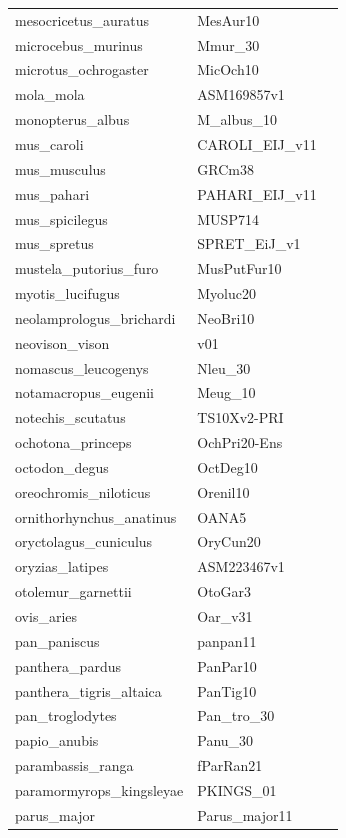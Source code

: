 \documentclass{article}
\begin{document}
\begin{table}[!h]
{\begin{tabular}{@{}lll@{}}
mesocricetus\_auratus&MesAur10&\\
microcebus\_murinus&Mmur\_30&\\
microtus\_ochrogaster&MicOch10&\\
mola\_mola&ASM169857v1&\\
monopterus\_albus&M\_albus\_10&\\
mus\_caroli&CAROLI\_EIJ\_v11&\\
mus\_musculus&GRCm38&\\
mus\_pahari&PAHARI\_EIJ\_v11&\\
mus\_spicilegus&MUSP714&\\
mus\_spretus&SPRET\_EiJ\_v1&\\
mustela\_putorius\_furo&MusPutFur10&\\
myotis\_lucifugus&Myoluc20&\\
neolamprologus\_brichardi&NeoBri10&\\
neovison\_vison&v01&\\
nomascus\_leucogenys&Nleu\_30&\\
notamacropus\_eugenii&Meug\_10&\\
notechis\_scutatus&TS10Xv2-PRI&\\
ochotona\_princeps&OchPri20-Ens&\\
octodon\_degus&OctDeg10&\\
oreochromis\_niloticus&Orenil10&\\
ornithorhynchus\_anatinus&OANA5&\\
oryctolagus\_cuniculus&OryCun20&\\
oryzias\_latipes&ASM223467v1&\\
otolemur\_garnettii&OtoGar3&\\
ovis\_aries&Oar\_v31&\\
pan\_paniscus&panpan11&\\
panthera\_pardus&PanPar10&\\
panthera\_tigris\_altaica&PanTig10&\\
pan\_troglodytes&Pan\_tro\_30&\\
papio\_anubis&Panu\_30&\\
parambassis\_ranga&fParRan21&\\
paramormyrops\_kingsleyae&PKINGS\_01&\\
parus\_major&Parus\_major11&\\
\hline
\end{tabular}}
\end{table}
\clearpage
\end{document}
